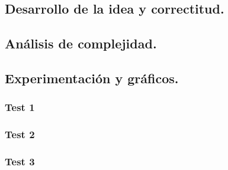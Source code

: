 \vspace*{0.6cm}

\subsection{Desarrollo de la idea y correctitud.}





\subsection{Análisis de complejidad.}

\vspace*{0.3cm}


\vspace*{0.6cm}

\subsection{Experimentación y gráficos.}

\vspace*{0.3cm}


\subsubsection{Test 1}

\vspace*{0.3cm}


\vspace*{0.6cm}

\subsubsection{Test 2}

\vspace*{0.3cm}


\vspace*{0.6cm}

\subsubsection{Test 3}

\vspace*{0.3cm}

